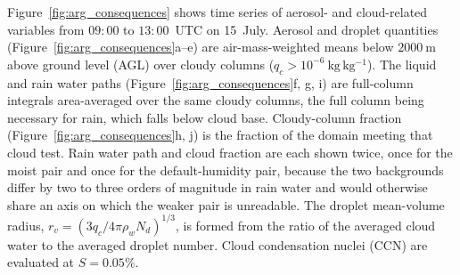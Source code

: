%

Figure~\ref{fig:arg_consequences} shows time series of aerosol- and cloud-related variables from $09{:}00$ to $13{:}00$~UTC on 15~July. Aerosol and droplet quantities (Figure~\ref{fig:arg_consequences}a--e) are air-mass-weighted means below $2000~\mathrm{m}$ above ground level (AGL) over cloudy columns ($q_c > 10^{-6}~\mathrm{kg\,kg^{-1}}$). The liquid and rain water paths (Figure~\ref{fig:arg_consequences}f, g, i) are full-column integrals area-averaged over the same cloudy columns, the full column being necessary for rain, which falls below cloud base. Cloudy-column fraction (Figure~\ref{fig:arg_consequences}h, j) is the fraction of the domain meeting that cloud test. Rain water path and cloud fraction are each shown twice, once for the moist pair and once for the default-humidity pair, because the two backgrounds differ by two to three orders of magnitude in rain water and would otherwise share an axis on which the weaker pair is unreadable. The droplet mean-volume radius, $r_v = \left(3 q_c / 4\pi\rho_w N_d\right)^{1/3}$, is formed from the ratio of the averaged cloud water to the averaged droplet number. Cloud condensation nuclei (CCN) are evaluated at $S=0.05\%$.

